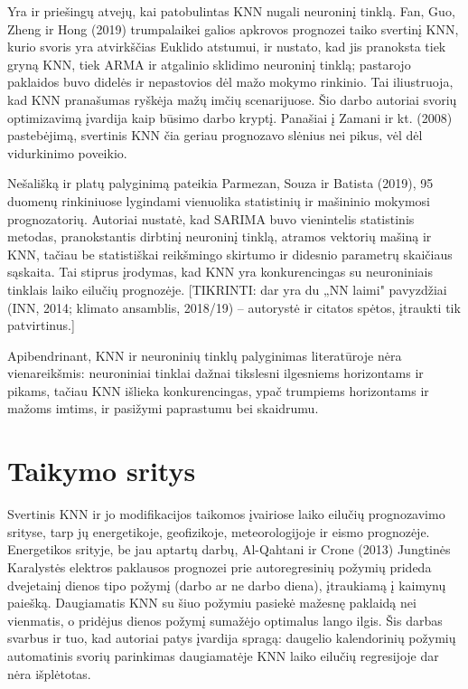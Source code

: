 \documentclass[]{VUMIFTemplateClass}
\begin{document}
    Yra ir priešingų atvejų, kai patobulintas KNN nugali neuroninį tinklą. Fan, Guo, Zheng ir Hong (2019) trumpalaikei galios apkrovos prognozei taiko svertinį KNN, kurio svoris yra atvirkščias Euklido atstumui, ir nustato, kad jis pranoksta tiek gryną KNN, tiek ARMA ir atgalinio sklidimo neuroninį tinklą; pastarojo paklaidos buvo didelės ir nepastovios dėl mažo mokymo rinkinio. Tai iliustruoja, kad KNN pranašumas ryškėja mažų imčių scenarijuose. Šio darbo autoriai svorių optimizavimą įvardija kaip būsimo darbo kryptį. Panašiai į Zamani ir kt. (2008) pastebėjimą, svertinis KNN čia geriau prognozavo slėnius nei pikus, vėl dėl vidurkinimo poveikio.

    Nešališką ir platų palyginimą pateikia Parmezan, Souza ir Batista (2019), 95 duomenų rinkiniuose lygindami vienuolika statistinių ir mašininio mokymosi prognozatorių. Autoriai nustatė, kad SARIMA buvo vienintelis statistinis metodas, pranokstantis dirbtinį neuroninį tinklą, atramos vektorių mašiną ir KNN, tačiau be statistiškai reikšmingo skirtumo ir didesnio parametrų skaičiaus sąskaita. Tai stiprus įrodymas, kad KNN yra konkurencingas su neuroniniais tinklais laiko eilučių prognozėje. [TIKRINTI: dar yra du „NN laimi" pavyzdžiai (INN, 2014; klimato ansamblis, 2018/19) -- autorystė ir citatos spėtos, įtraukti tik patvirtinus.]

    Apibendrinant, KNN ir neuroninių tinklų palyginimas literatūroje nėra vienareikšmis: neuroniniai tinklai dažnai tikslesni ilgesniems horizontams ir pikams, tačiau KNN išlieka konkurencingas, ypač trumpiems horizontams ir mažoms imtims, ir pasižymi paprastumu bei skaidrumu. %


    \section{Taikymo sritys}

    Svertinis KNN ir jo modifikacijos taikomos įvairiose laiko eilučių prognozavimo srityse, tarp jų energetikoje, geofizikoje, meteorologijoje ir eismo prognozėje. Energetikos srityje, be jau aptartų darbų, Al-Qahtani ir Crone (2013) Jungtinės Karalystės elektros paklausos prognozei prie autoregresinių požymių prideda dvejetainį dienos tipo požymį (darbo ar ne darbo diena), įtraukiamą į kaimynų paiešką. Daugiamatis KNN su šiuo požymiu pasiekė mažesnę paklaidą nei vienmatis, o pridėjus dienos požymį sumažėjo optimalus lango ilgis. Šis darbas svarbus ir tuo, kad autoriai patys įvardija spragą: daugelio kalendorinių požymių automatinis svorių parinkimas daugiamatėje KNN laiko eilučių regresijoje dar nėra išplėtotas.
\end{document}
